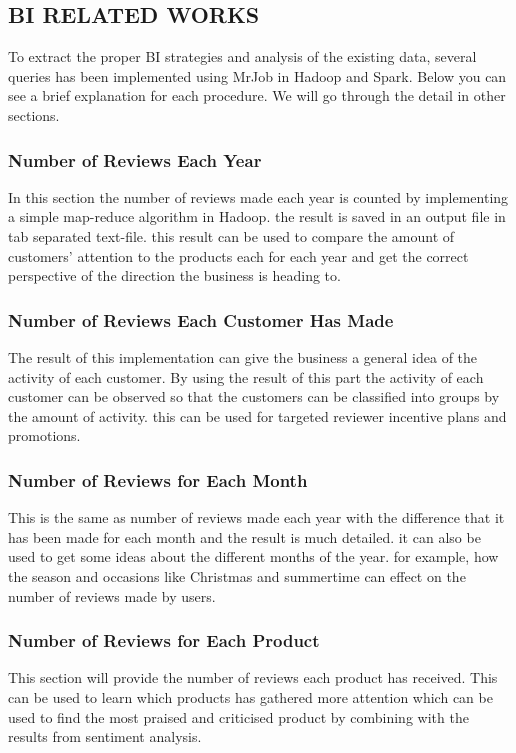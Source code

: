 \subsection{BI RELATED WORKS}
To extract the proper BI strategies and analysis of the existing data, several queries has been implemented using MrJob in Hadoop and Spark. Below you can see a brief explanation for each procedure. We will go through the detail in other sections.

\subsubsection{Number of Reviews Each Year}

In this section the number of reviews made each year is counted by implementing a simple map-reduce algorithm in Hadoop. the result is saved in an output file in tab separated text-file. this result can be used to compare the amount of customers' attention to the products each for each year and get the correct perspective of the direction  the business is heading to.

\subsubsection{Number of Reviews Each Customer Has Made}

The result of this implementation can give the business a general idea of the activity of each customer. By using the result of this part the activity of each customer can be observed so that the customers can be classified into groups by the amount of activity. this can be used for targeted reviewer incentive plans and promotions.

\subsubsection{Number of Reviews for Each Month}

This is the same as number of reviews made each year with the difference that it has been made for each month and the result is much detailed. it can also be used to get some ideas about the different months of the year. for example, how the season and occasions like Christmas and summertime can effect on the number of reviews made by users.
\subsubsection{Number of Reviews for Each Product}
This section will provide the number of reviews each product has received. This can be used to learn which products has gathered more attention which can be used to find the most praised and criticised product by combining with the results from sentiment analysis. 
